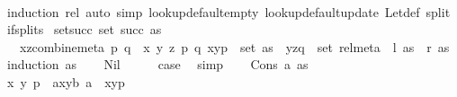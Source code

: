 \begin{isabellebody}
%
\isadelimproof
\ \ %
\endisadelimproof
%
\isatagproof
{}\isamarkupfalse%
\ {\isacharparenleft}{\kern0pt}induction\ rel{\isacharparenright}{\kern0pt}\ {\isacharparenleft}{\kern0pt}auto\ simp{\isacharcolon}{\kern0pt}\ lookup{\isacharunderscore}{\kern0pt}default{\isacharunderscore}{\kern0pt}empty\ lookup{\isacharunderscore}{\kern0pt}default{\isacharunderscore}{\kern0pt}update{\isacharprime}{\kern0pt}\ Let{\isacharunderscore}{\kern0pt}def\ split{\isacharcolon}{\kern0pt}\ if{\isacharunderscore}{\kern0pt}splits{\isacharparenright}{\kern0pt}%
\endisatagproof
{\isafoldproof}%
%
\isadelimproof
\isanewline
%
\endisadelimproof
\isanewline
{}\isamarkupfalse%
\ set{\isacharunderscore}{\kern0pt}succ{\isacharcolon}{\kern0pt}\ {\isachardoublequoteopen}set\ {\isacharparenleft}{\kern0pt}succ\ as{\isacharparenright}{\kern0pt}\isanewline
\ \ {\isacharequal}{\kern0pt}\ {\isacharbraceleft}{\kern0pt}{\isacharparenleft}{\kern0pt}{\isacharparenleft}{\kern0pt}x{\isacharcomma}{\kern0pt}z{\isacharparenright}{\kern0pt}{\isacharcomma}{\kern0pt}combine{\isacharunderscore}{\kern0pt}meta\ p\ q{\isacharparenright}{\kern0pt}\ {\isacharbar}{\kern0pt}\ x\ y\ z\ p\ q{\isachardot}{\kern0pt}\ {\isacharparenleft}{\kern0pt}{\isacharparenleft}{\kern0pt}x{\isacharcomma}{\kern0pt}y{\isacharparenright}{\kern0pt}{\isacharcomma}{\kern0pt}p{\isacharparenright}{\kern0pt}\ {\isasymin}\ set\ as\ {\isasymand}\ {\isacharparenleft}{\kern0pt}{\isacharparenleft}{\kern0pt}y{\isacharcomma}{\kern0pt}z{\isacharparenright}{\kern0pt}{\isacharcomma}{\kern0pt}q{\isacharparenright}{\kern0pt}\ {\isasymin}\ set\ rel{\isacharunderscore}{\kern0pt}meta{\isacharbraceright}{\kern0pt}{\isachardoublequoteclose}\ {\isacharparenleft}{\kern0pt}\ {\isachardoublequoteopen}{\isacharquery}{\kern0pt}l\ as\ {\isacharequal}{\kern0pt}\ {\isacharquery}{\kern0pt}r\ as{\isachardoublequoteclose}{\isacharparenright}{\kern0pt}\isanewline
%
\isadelimproof
%
\endisadelimproof
%
\isatagproof
{}\isamarkupfalse%
\ {\isacharparenleft}{\kern0pt}induction\ as{\isacharparenright}{\kern0pt}\isanewline
\ \ \isamarkupfalse%
\ Nil\isanewline
\ \ \isamarkupfalse%
\ \isamarkupfalse%
\ {\isacharquery}{\kern0pt}case\ \isamarkupfalse%
\ simp\isanewline
{}\isamarkupfalse%
\isanewline
\ \ \isamarkupfalse%
\ {\isacharparenleft}{\kern0pt}Cons\ a\ as{\isacharparenright}{\kern0pt}\isanewline
\ \ \isamarkupfalse%
\ \isamarkupfalse%
\ x\ y\ p\ \ a{\isacharunderscore}{\kern0pt}xyb{\isacharcolon}{\kern0pt}\ {\isachardoublequoteopen}a\ {\isacharequal}{\kern0pt}\ {\isacharparenleft}{\kern0pt}{\isacharparenleft}{\kern0pt}x{\isacharcomma}{\kern0pt}y{\isacharparenright}{\kern0pt}{\isacharcomma}{\kern0pt}p{\isacharparenright}{\kern0pt}{\isachardoublequoteclose}\ \isamarkupfalse%

\end{isabellebody}

